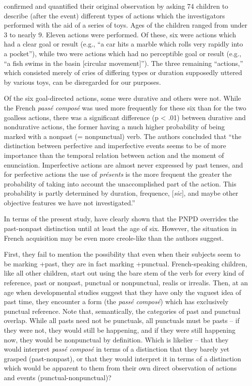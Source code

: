 \citeauthor{BrockartEtAl1973} confirmed and quantified their original observation by asking 74 children to describe (after the event) different types of actions which the investigators performed with the aid of a series of toys. Ages of the children ranged from under 3 to nearly 9. Eleven actions were performed. Of these, six were actions which had a clear goal or result (e.g., ``a car hits a marble which rolls very rapidly into a pocket''), while two were actions which had no perceptible goal or result (e.g., ``a fish swims in the basin [circular movement]''). The three remaining ``actions,'' which consisted merely of cries of differing types or duration supposedly uttered by various toys, can be disregarded for our purposes.

Of the six goal-directed actions, some were durative and others were not. While the French \textit{pass\'e compos\'e} was used more frequently for these six than for the two goalless actions, there was a significant difference (p {\textless} .01) between durative and nondurative actions, the former having a much higher probability of being marked with a nonpast (= nonpunctual) verb. The authors concluded that ``the distinction between perfective and imperfective events seems to be of more importance than the temporal relation between action and the moment of enunciation. Imperfective actions are almost never ex\-pressed by past tenses, and for perfective actions the use of \textit{pr\'esents} is the more frequent the greater the probability of taking into account the unaccomplished part of the action. This probability is partly determined by duration, frequence, [\textit{sic}], and maybe other objective features we have not investigated.''


In terms of the present study, \citeauthor{BrockartEtAl1973} have clearly shown that the PNPD overrides the past-nonpast distinction until at least the age of six. However, the situation in French acquisition may be even more creole-like than the authors suggest.

First, they fail to mention the possibility that even when their subjects seem to be marking +past, they are in fact marking +punctual. French-speaking children, like all other children, start out using the bare stem of the verb for every kind of reference, past or nonpast, punctual or nonpunctual, realis or irrealis. Then, at an age when devel\-opmental studies suggest that they have only the vaguest idea of past time, they encounter a form (the \textit{pass\'e compos\'e}) which has exclusively punctual reference. Note that, semantically, the categories of past and punctual overlap. While all pasts need not be punctuals, all punctuals must be pasts -- if they were not, they would still be happening, and if they were still happening now, they would be nonpunctual by defini\-tion. Which is likelier -- that they would interpret \textit{pass\'e compos\'e} in terms of a distinction that they barely yet grasped (past-nonpast), or that they would interpret it in terms of a distinction which would be apparent to them from their own direct observation of actions and events (punctual-nonpunctual)?

